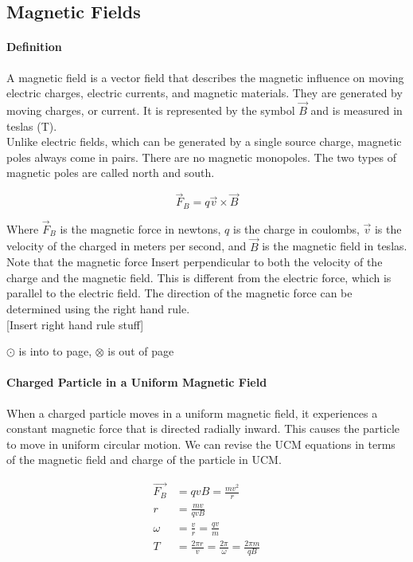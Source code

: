 \subsection{Magnetic Fields}
\hrulefill

\paragraph*{Definition}
    A magnetic field is a vector field that describes the magnetic influence on moving electric charges, 
electric currents, and magnetic materials. They are generated by moving charges, or current. 
It is represented by the symbol $\vec{B}$ and is measured in teslas (T).\\

    Unlike electric fields, which can be generated by a single source charge, magnetic poles always come in pairs. 
There are no magnetic monopoles. The two types of magnetic poles are called north and south.

\begin{equation*}
    \vec{F}_B = q\vec{v} \times \vec{B}
\end{equation*}

    Where $\vec{F}_B$ is the magnetic force in newtons, $q$ is the charge in coulombs, $\vec{v}$ is the velocity
of the charged in meters per second, and $\vec{B}$ is the magnetic field in teslas.\\

    Note that the magnetic force Insert perpendicular to both the velocity of the charge and the magnetic field. 
This is different from the electric force, which is parallel to the electric field. The direction of the magnetic 
force can be determined using the right hand rule.\\

[Insert right hand rule stuff]

$\odot$ is into to page, $\otimes$ is out of page


\paragraph{Charged Particle in a Uniform Magnetic Field}
When a charged particle moves in a uniform magnetic field, it experiences a constant magnetic force that is directed
radially inward. This causes the particle to move in uniform circular motion. We can revise the UCM equations in terms
of the magnetic field and charge of the particle in UCM.

\begin{align*}
    \vec{F_B} &= qvB = \frac{mv^2}{r}\\
    r &= \frac{mv}{qvB}\\
    \omega &= \frac{v}{r} = \frac{qv}{m}\\
    T &= \frac{2\pi r}{v} = \frac{2\pi}{\omega} = \frac{2\pi m}{qB}\\
\end{align*}


